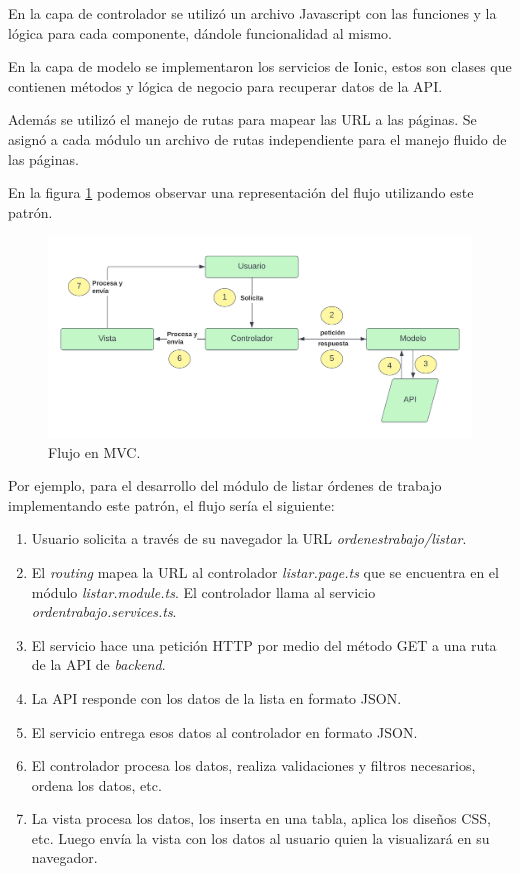 En la capa de controlador se utilizó un archivo Javascript con las funciones y la lógica para cada componente, dándole funcionalidad al mismo. 

En la capa de modelo se implementaron los servicios de Ionic, estos son clases que contienen métodos y lógica de negocio para recuperar datos de la API. 

Además se utilizó el manejo de rutas para mapear las URL a las páginas. Se asignó a cada módulo un archivo de rutas independiente para el manejo fluido de las páginas.

En la figura \ref{fig:frontmvc} podemos observar una representación del flujo utilizando este patrón. 

\begin{figure}[H]
	\centering
	\includegraphics[scale=.15]{./Figures/front-mvc.png}
	\caption{Flujo en MVC.}
	\label{fig:frontmvc}
\end{figure}

Por ejemplo, para el desarrollo del módulo de listar órdenes de trabajo implementando este patrón, el flujo sería el siguiente:

\begin{enumerate}
\item Usuario solicita a través de su navegador la URL \textit{ordenestrabajo/listar}.
\item El \textit{routing} mapea la URL al controlador \textit{listar.page.ts} que se encuentra en el módulo \textit{listar.module.ts}. El controlador llama al servicio \textit{ordentrabajo.services.ts}.
\item El servicio hace una petición HTTP por medio del método GET a una ruta de la API de \textit{backend}. 
\item La API responde con los datos de la lista en formato JSON.
\item El servicio entrega esos datos al controlador en formato JSON.
\item El controlador procesa los datos, realiza validaciones y filtros necesarios, ordena los datos, etc.
\item La vista procesa los datos, los inserta en una tabla, aplica los diseños CSS, etc. Luego envía la vista con los datos al usuario quien la visualizará en su navegador. 
\end{enumerate}

